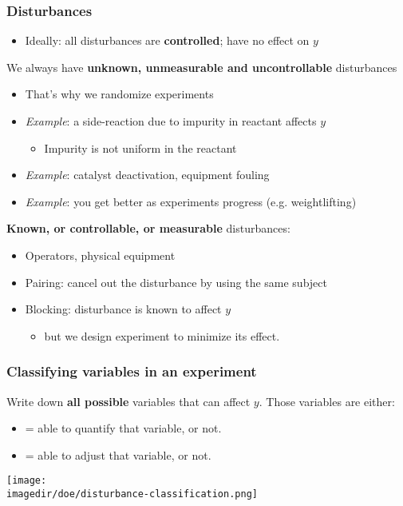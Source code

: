 \begin{frame}\frametitle{Disturbances}
	\begin{itemize}
		\item	Ideally: all disturbances are \textbf{controlled}; have no effect on $y$
	\end{itemize}

	We always have \textbf{unknown, unmeasurable and uncontrollable} disturbances
	\begin{itemize}
		\item	That's why we randomize experiments
		\item	\emph{Example}: a side-reaction due to impurity in reactant affects $y$
		\begin{itemize}
			\item	Impurity is not uniform in the reactant
		\end{itemize}
		\item	\emph{Example}: catalyst deactivation, equipment fouling
		\item	\emph{Example}: you get better as experiments progress (e.g. weightlifting)
	\end{itemize}

	\textbf{Known, or controllable, or measurable} disturbances:
	\begin{itemize}
		\item	Operators, physical equipment
		\item	Pairing: cancel out the disturbance by using the same subject
		\item	Blocking: disturbance is known to affect $y$
		\begin{itemize}
			\item	but we design experiment to minimize its effect.
		\end{itemize}
	\end{itemize}
\end{frame}

\begin{frame}\frametitle{Classifying variables in an experiment}
	Write down \textbf{all possible} variables that can affect $y$. Those variables are either:
	\begin{itemize}
		\item	{\color{purple}{Measurable}} = able to quantify that variable, or not.
		\item	{\color{purple}{Controllable}} = able to adjust that variable, or not.
	\end{itemize}
	\begin{center}
		\texttt{[image: \\imagedir/doe/disturbance-classification.png]}
	\end{center}
\end{frame}

